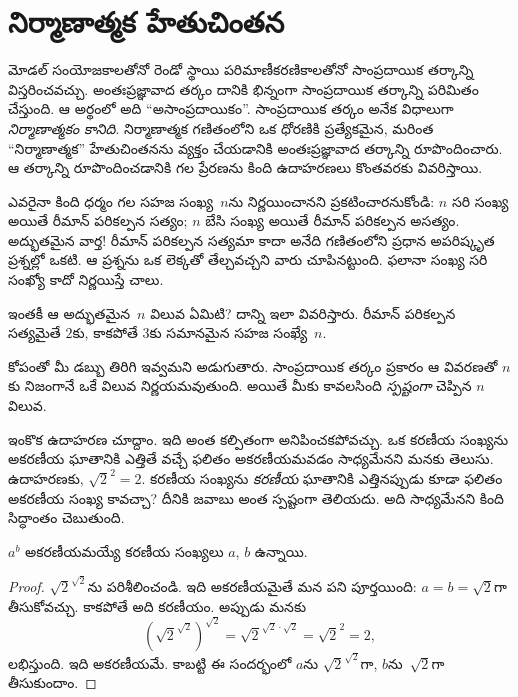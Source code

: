 \documentclass[../../../include/open-logic-chapter]{subfiles}
\begin{document}

\section{నిర్మాణాత్మక హేతుచింతన}

మోడల్ సంయోజకాలతోనో రెండో స్థాయి పరిమాణీకరణికాలతోనో
సాంప్రదాయిక తర్కాన్ని విస్తరించవచ్చు. అంతఃప్రజ్ఞావాద తర్కం
దానికి భిన్నంగా సాంప్రదాయిక తర్కాన్ని పరిమితం చేస్తుంది.
ఆ అర్థంలో అది ``అసాంప్రదాయికం''.
సాంప్రదాయిక తర్కం అనేక విధాలుగా
\emph{నిర్మాణాత్మకం కానిది}. నిర్మాణాత్మక గణితంలోని ఒక ధోరణికి
ప్రత్యేకమైన, మరింత ``నిర్మాణాత్మక''
హేతుచింతనను వ్యక్తం చేయడానికి అంతఃప్రజ్ఞావాద తర్కాన్ని
రూపొందించారు. ఆ తర్కాన్ని రూపొందించడానికి గల ప్రేరణను కింది ఉదాహరణలు
కొంతవరకు వివరిస్తాయి.

ఎవరైనా కింది ధర్మం గల సహజ సంఖ్య~$n$ను
నిర్ణయించానని ప్రకటించారనుకోండి: $n$ సరి సంఖ్య
అయితే రీమాన్ పరికల్పన సత్యం; $n$ బేసి సంఖ్య
అయితే రీమాన్ పరికల్పన అసత్యం. అద్భుతమైన వార్త!{}
రీమాన్ పరికల్పన సత్యమా కాదా అనేది గణితంలోని
ప్రధాన అపరిష్కృత ప్రశ్నల్లో ఒకటి. ఆ ప్రశ్నను
ఒక లెక్కతో తేల్చవచ్చని వారు చూపినట్టుంది. ఫలానా
సంఖ్య సరి సంఖ్యో కాదో నిర్ణయిస్తే చాలు.

ఇంతకీ ఆ అద్భుతమైన~$n$ విలువ ఏమిటి? దాన్ని
ఇలా వివరిస్తారు. రీమాన్ పరికల్పన సత్యమైతే
$2$కు, కాకపోతే $3$కు సమానమైన సహజ సంఖ్యే~$n$.

కోపంతో మీ డబ్బు తిరిగి ఇవ్వమని అడుగుతారు.
సాంప్రదాయిక తర్కం ప్రకారం ఆ వివరణతో $n$కు నిజంగానే
ఒకే విలువ నిర్ణయమవుతుంది. అయితే మీకు కావలసింది
\emph{స్పష్టంగా} చెప్పిన $n$ విలువ.

ఇంకొక ఉదాహరణ చూద్దాం. ఇది అంత కల్పితంగా
అనిపించకపోవచ్చు. ఒక కరణీయ సంఖ్యను అకరణీయ ఘాతానికి ఎత్తితే వచ్చే ఫలితం
అకరణీయమవడం సాధ్యమేనని మనకు తెలుసు.
ఉదాహరణకు, $\sqrt{2}^2 = 2$. కరణీయ సంఖ్యను
\emph{కరణీయ} ఘాతానికి ఎత్తినప్పుడు కూడా ఫలితం అకరణీయ సంఖ్య కావచ్చా?
దీనికి జవాబు అంత స్పష్టంగా తెలియదు. అది సాధ్యమేనని
కింది సిద్ధాంతం చెబుతుంది.

\begin{thm}
$a^b$ అకరణీయమయ్యే కరణీయ సంఖ్యలు $a$, $b$ ఉన్నాయి.
\end{thm}

\begin{proof}
$\sqrt{2}^{\sqrt{2}}$ను పరిశీలించండి. ఇది
అకరణీయమైతే మన పని పూర్తయింది: $a = b = \sqrt{2}$గా
తీసుకోవచ్చు. కాకపోతే అది కరణీయం. అప్పుడు
మనకు
\[
(\sqrt{2}^{\sqrt{2}})^{\sqrt{2}} = \sqrt{2}^{\sqrt{2} \cdot
  \sqrt{2}} = \sqrt{2}^2 = 2,
\]
లభిస్తుంది. ఇది అకరణీయమే. కాబట్టి ఈ సందర్భంలో
$a$ను $\sqrt{2}^{\sqrt{2}}$గా, $b$ను~$\sqrt 2$గా
తీసుకుందాం.
\end{proof}
\end{document}
